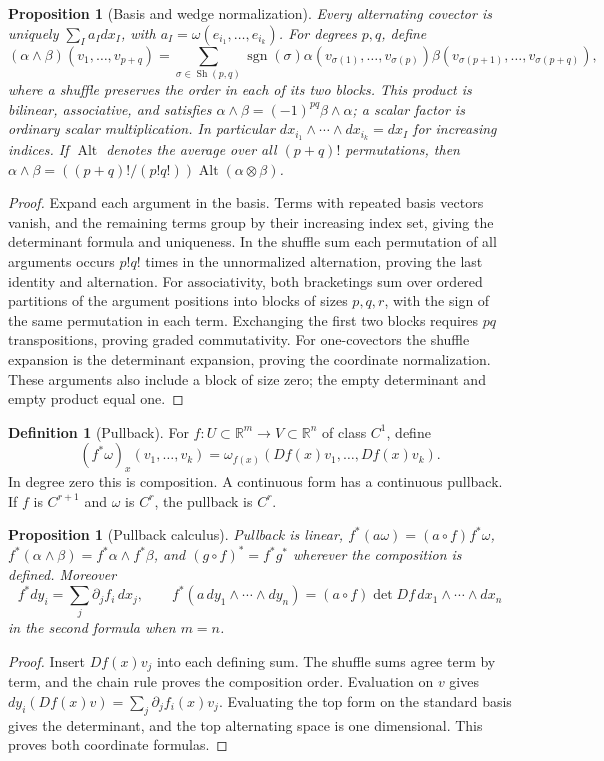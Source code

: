 \documentclass[11pt,oneside,openany]{book}
\newtheorem{proposition}[theorem]{Proposition}
\theoremstyle{definition}
\newtheorem{definition}[theorem]{Definition}
\theoremstyle{remark}
\newcommand{\R}{\mathbb R}
\DeclareMathOperator{\sgn}{sgn}
\newcommand{\family}[1]{}
\begin{document}
\begin{proposition}[Basis and wedge normalization]\label{d04:13:wedge}
Every alternating covector is uniquely $\sum_I a_I dx_I$, with
$a_I=\omega(e_{i_1},\ldots,e_{i_k})$. For degrees $p,q$, define
\[
 (\alpha\wedge\beta)(v_1,\ldots,v_{p+q})
 =\sum_{\sigma\in\operatorname{Sh}(p,q)}\sgn(\sigma)
 \alpha(v_{\sigma(1)},\ldots,v_{\sigma(p)})
 \beta(v_{\sigma(p+1)},\ldots,v_{\sigma(p+q)}),
\]
where a shuffle preserves the order in each of its two blocks. This product
is bilinear, associative, and satisfies
$\alpha\wedge\beta=(-1)^{pq}\beta\wedge\alpha$; a scalar factor is ordinary
scalar multiplication. In particular $dx_{i_1}\wedge\cdots\wedge dx_{i_k}=dx_I$
for increasing indices. If $\operatorname{Alt}$ denotes the average over all
$(p+q)!$ permutations, then
$\alpha\wedge\beta=((p+q)!/(p!q!))\operatorname{Alt}(\alpha\otimes\beta)$.
\end{proposition}
\begin{proof}
Expand each argument in the basis. Terms with repeated basis vectors vanish,
and the remaining terms group by their increasing index set, giving the
determinant formula and uniqueness. In the shuffle sum each permutation of
all arguments occurs $p!q!$ times in the unnormalized alternation, proving
the last identity and alternation. For associativity, both bracketings sum
over ordered partitions of the argument positions into blocks of sizes
$p,q,r$, with the sign of the same permutation in each term. Exchanging the
first two blocks requires $pq$ transpositions, proving graded commutativity.
For one-covectors the shuffle expansion is the determinant expansion, proving
the coordinate normalization. These arguments also include a block of size
zero; the empty determinant and empty product equal one.
\end{proof}

\family{K04.13.04}
\begin{definition}[Pullback]\label{d04:13:pullback}
For $f:U\subset\R^m\to V\subset\R^n$ of class $C^1$, define
\[
 (f^*\omega)_x(v_1,\ldots,v_k)
 =\omega_{f(x)}(Df(x)v_1,\ldots,Df(x)v_k).
\]
In degree zero this is composition. A continuous form has a continuous
pullback. If $f$ is $C^{r+1}$ and $\omega$ is $C^r$, the pullback is $C^r$.
\end{definition}
\begin{proposition}[Pullback calculus]\label{d04:13:pullback-rules}
Pullback is linear, $f^*(a\omega)=(a\circ f)f^*\omega$,
$f^*(\alpha\wedge\beta)=f^*\alpha\wedge f^*\beta$, and
$(g\circ f)^*=f^*g^*$ wherever the composition is defined. Moreover
\[
 f^*dy_i=\sum_j\partial_j f_i\,dx_j,\qquad
 f^*(a\,dy_1\wedge\cdots\wedge dy_n)
 =(a\circ f)\det Df\,dx_1\wedge\cdots\wedge dx_n
\]
in the second formula when $m=n$.
\end{proposition}
\begin{proof}
Insert $Df(x)v_j$ into each defining sum. The shuffle sums agree term by
term, and the chain rule proves the composition order. Evaluation on $v$
gives $dy_i(Df(x)v)=\sum_j\partial_jf_i(x)v_j$. Evaluating the top form on
the standard basis gives the determinant, and the top alternating space is
one dimensional. This proves both coordinate formulas.
\end{proof}
\end{document}
